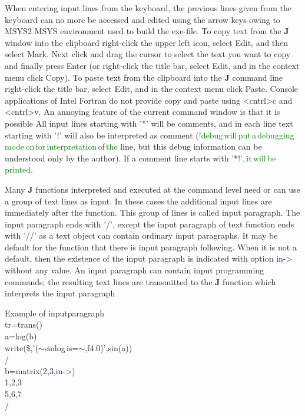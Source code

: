  When entering input lines from the keyboard, the previous lines given from the keyboard can no more be
 accessed and edited using the arrow keys owing to MSYS2 MSYS environment used to build the exe-file.
 To copy text from the \textbf{J} window into the clipboard right-click the upper left icon, select Edit,
 and then select Mark. Next click and drag the cursor to select the text you want to copy and
 finally press Enter (or right-click the title bar, select Edit, and in the context menu click Copy).
 To paste text from the clipboard into the \textbf{J} command line right-click the title bar, select Edit,
 and in the context menu click Paste. Console applications of Intel Fortran do not provide copy
 and paste using <cntrl>c and <cntrl>v. An annoying feature of the current command window is that it is possible
 All input lines starting with '*' will be comments, and in each line text starting with '!' will also
 be interpreted as comment (\textcolor{green}{!debug\,will\,put\,a\,debugging\,mode\,on\,for\,interpretation\,of\,the}
 line, but this debug information can be understood only by the author). If a comment line starts
 with '*\textcolor{green}{!',\,it\,will\,be\,printed.}

 Many \textbf{J} functions interpreted and executed at the command level need or can use a group of
 text lines as input. In these cases the additional input lines are immediately after the function.
 This group of lines is called input paragraph. The input paragraph ends with '/', except the
 input paragraph of text function ends with '//' as a text object can contain ordinary input
 paragraphs. It may be default for the function that there is input paragraph following. When
 it is not a default, then the existence of the input paragraph is indicated with option \textcolor{blue}{in->}
 without any value. An input paragraph can contain input programming commands; the
 resulting text lines are transmitted to the \textbf{J} function which interprets the input paragraph
\begin{example}[inpuparag]Example of inputparagraph\\
\label{inpuparag}
 tr=\textcolor{VioletRed}{trans}()\\
 a=\textcolor{VioletRed}{log}(b)\\
 \textcolor{VioletRed}{write}(\$,'($\sim$sinlog\,is=$\sim$,f4.0)',\textcolor{VioletRed}{sin}(a))\\
 /\\
 b=\textcolor{VioletRed}{matrix}(2,3,\textcolor{blue}{in->})\\
 1,2,3\\
 5,6,7\\
/
\end{example}
